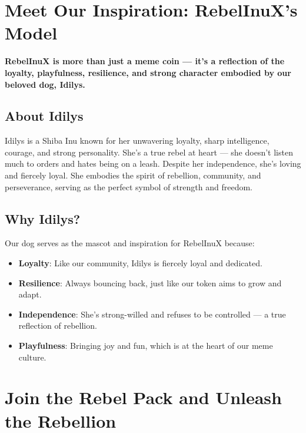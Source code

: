 \documentclass{article}
\begin{document}
\section[
\texorpdfstring{\color{primaryColor}Meet Our Inspiration: RebelInuX’s Model}{Meet Our Inspiration: RebelInuX’s Model}
]{\color{primaryColor}\textbf{Meet Our Inspiration: RebelInuX’s Model}}
\begin{tcolorbox}[colback=headerColor!10!white, colframe=headerColor, boxrule=0.8mm, width=\textwidth, arc=6mm, left=8mm, right=8mm, top=6mm, bottom=6mm]

\textbf{RebelInuX is more than just a meme coin — it’s a reflection of the loyalty, playfulness, resilience, and strong character embodied by our beloved dog, Idilys.}

\subsection*{About Idilys}

Idilys is a Shiba Inu known for her unwavering loyalty, sharp intelligence, courage, and strong personality. She’s a true rebel at heart — she doesn’t listen much to orders and hates being on a leash. Despite her independence, she’s loving and fiercely loyal. She embodies the spirit of rebellion, community, and perseverance, serving as the perfect symbol of strength and freedom.

\subsection*{Why Idilys?}

Our dog serves as the mascot and inspiration for RebelInuX because:

\begin{itemize}
  \item \textbf{Loyalty}: Like our community, Idilys is fiercely loyal and dedicated.
  \item \textbf{Resilience}: Always bouncing back, just like our token aims to grow and adapt.
  \item \textbf{Independence}: She’s strong-willed and refuses to be controlled — a true reflection of rebellion.
  \item \textbf{Playfulness}: Bringing joy and fun, which is at the heart of our meme culture.
\end{itemize}

\end{tcolorbox}

\section[
\texorpdfstring{\color{primaryColor}Join the Rebel Pack and Unleash the Rebellion}{Join the Rebel Pack and Unleash the Rebellion}
]{\color{primaryColor}\textbf{Join the Rebel Pack and Unleash the Rebellion}}
\end{document}
